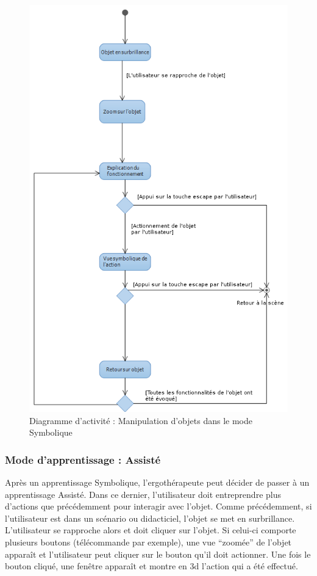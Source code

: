 \begin{figure}[h]
\centering
\includegraphics[width=1\textwidth]{2-Specifications/img-utilisateur/activite-symbolique.png}
\caption{\label{fig:CasUsageSymbolique} Diagramme d'activité : Manipulation d'objets dans le mode Symbolique }
\end{figure}
\FloatBarrier


\subsubsection{Mode d'apprentissage : Assisté}

Après un apprentissage Symbolique, l'ergothérapeute peut décider de passer à un apprentissage Assisté. Dans ce dernier, l'utilisateur doit entreprendre plus d'actions que précédemment pour interagir avec l'objet. Comme précédemment, si l'utilisateur est dans un scénario ou didacticiel, l'objet se met en surbrillance. L'utilisateur se rapproche alors et doit cliquer sur l'objet. Si celui-ci comporte plusieurs boutons (télécommande par exemple), une vue \enquote{zoomée} de l'objet apparaît et l'utilisateur peut cliquer sur le bouton qu'il doit actionner. Une fois le bouton cliqué, une fenêtre apparaît et montre en 3d l'action qui a été effectué.

